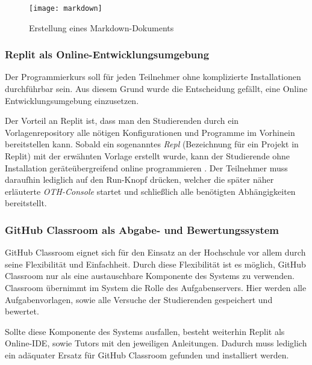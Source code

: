 \begin{figure}[H]
    \centering
    \texttt{[image: markdown]}
    \caption{Erstellung eines Markdown-Dokuments}
    \label{fig:markdown}
\end{figure}

\subsubsection{Replit als Online-Entwicklungsumgebung}
Der Programmierkurs soll für jeden Teilnehmer ohne komplizierte Installationen
durchführbar sein. Aus diesem Grund wurde die Entscheidung gefällt, eine
Online Entwicklungsumgebung einzusetzen.

Der Vorteil an Replit ist, dass man den Studierenden durch ein
Vorlagenrepository alle nötigen Konfigurationen und Programme im Vorhinein
bereitstellen kann. Sobald ein sogenanntes \emph{Repl} (Bezeichnung für
ein Projekt in Replit) mit der erwähnten Vorlage erstellt wurde, kann der
Studierende ohne Installation geräteübergreifend online programmieren
\parencite{replit-import-from-github}. Der Teilnehmer muss daraufhin lediglich
auf den \glqq Run\grqq{}-Knopf drücken, welcher die später näher erläuterte
\emph{OTH-Console} startet und schließlich alle benötigten Abhängigkeiten
bereitstellt.

\subsubsection{GitHub Classroom als Abgabe- und Bewertungssystem}
GitHub Classroom eignet sich für den Einsatz an der Hochschule vor allem durch
seine Flexibilität und Einfachheit. Durch diese Flexibilität ist es möglich,
GitHub Classroom nur als eine austauschbare Komponente des Systems zu verwenden.
Classroom übernimmt im System die Rolle des Aufgabenservers. Hier werden alle
Aufgabenvorlagen, sowie alle Versuche der Studierenden gespeichert und bewertet.

Sollte diese Komponente des Systems ausfallen, besteht weiterhin Replit als
Online-IDE, sowie Tutors mit den jeweiligen Anleitungen. Dadurch muss lediglich
ein adäquater Ersatz für GitHub Classroom gefunden und installiert werden.